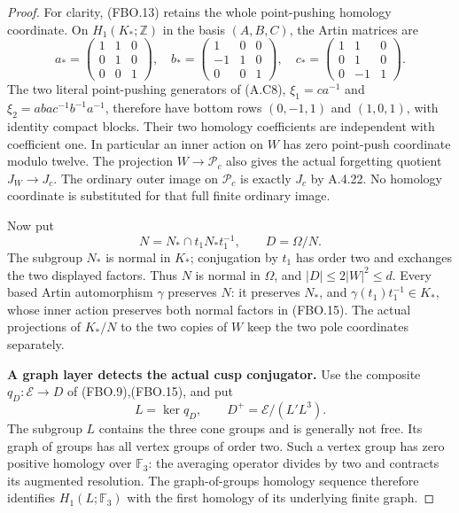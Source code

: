 \begin{proof}
For clarity, (FBO.13) retains the whole point-pushing homology
coordinate.  On $H_1(K_*;\mathbb Z)$ in the basis $(A,B,C)$,
the Artin matrices are
\[
 a_*=
 \begin{pmatrix}1&1&0\\0&1&0\\0&0&1\end{pmatrix},\quad
 b_*=
 \begin{pmatrix}1&0&0\\-1&1&0\\0&0&1\end{pmatrix},\quad
 c_*=
 \begin{pmatrix}1&1&0\\0&1&0\\0&-1&1\end{pmatrix}.
                                                               \tag{FBO.14}
\]
The two literal point-pushing generators of (A.C8),
$\xi_1=ca^{-1}$ and
$\xi_2=aba c^{-1}b^{-1}a^{-1}$, therefore have bottom rows
$(0,-1,1)$ and $(1,0,1)$, with identity compact blocks.
Their two homology coefficients are independent with coefficient
one.  In particular an inner action on $W$ has zero point-push
coordinate modulo twelve.  The projection $W\to\mathcal P_c$
also gives the actual forgetting quotient $J_W\to J_c$.
The ordinary outer image on $\mathcal P_c$ is exactly $J_c$
by A.4.22.  No homology coordinate is substituted for that
full finite ordinary image.

Now put
\[
 N=N_*\cap t_1N_*t_1^{-1},\qquad
 D=\Omega/N.
                                                               \tag{FBO.15}
\]
The subgroup $N_*$ is normal in $K_*$; conjugation by $t_1$
has order two and exchanges the two displayed factors.
Thus $N$ is normal in $\Omega$, and
$|D|\leq2|W|^2\leq d$.
Every based Artin automorphism $\gamma$ preserves $N$:
it preserves $N_*$, and $\gamma(t_1)t_1^{-1}\in K_*$,
whose inner action preserves both normal factors in (FBO.15).
The actual projections of $K_*/N$ to the two copies of $W$
keep the two pole coordinates separately.

\par\medskip\noindent\textbf{A graph layer detects the actual cusp conjugator.}\quad
Use the composite $q_D:\mathcal E\to D$ of (FBO.9),(FBO.15),
and put
\[
 L=\ker q_D,\qquad
 D^+=\mathcal E/(L'L^3).
                                                               \tag{FBO.16}
\]
The subgroup $L$ contains the three cone groups and is generally
not free.  Its graph of groups has all vertex groups of order
two.  Such a vertex group has zero positive homology over
$\mathbb F_3$: the averaging operator divides by two and
contracts its augmented resolution.  The graph-of-groups
homology sequence therefore identifies
$H_1(L;\mathbb F_3)$ with the first homology of its underlying
finite graph.


\end{proof}

